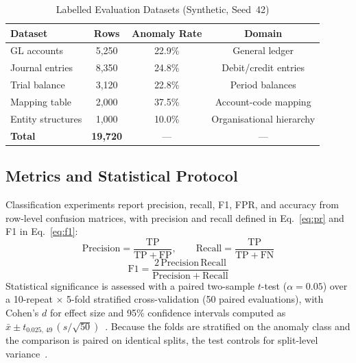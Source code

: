 \documentclass{ieeeaccess}
\begin{document}
\begin{table}[tbp]
\centering
\caption{Labelled Evaluation Datasets (Synthetic, Seed~42)}
\label{tab:datasets}
\small\setlength{\tabcolsep}{4pt}
\begin{tabular}{|l|c|c|c|}
\hline
\textbf{Dataset} & \textbf{Rows} & \textbf{Anomaly Rate} & \textbf{Domain} \\
\hline
GL accounts & 5{,}250 & 22.9\% & General ledger \\
\hline
Journal entries & 8{,}350 & 24.8\% & Debit/credit entries \\
\hline
Trial balance & 3{,}120 & 22.8\% & Period balances \\
\hline
Mapping table & 2{,}000 & 37.5\% & Account-code mapping \\
\hline
Entity structures & 1{,}000 & 10.0\% & Organisational hierarchy \\
\hline
\textbf{Total} & \textbf{19{,}720} & --- & --- \\
\hline
\end{tabular}
\end{table}

\subsection{Metrics and Statistical Protocol}
Classification experiments report precision, recall, F1, FPR, and accuracy from row-level confusion matrices, with
precision and recall defined in Eq.~\ref{eq:pr} and F1 in Eq.~\ref{eq:f1}:
\begin{equation}
\mathrm{Precision} = \frac{\mathrm{TP}}{\mathrm{TP}+\mathrm{FP}}, \qquad
\mathrm{Recall} = \frac{\mathrm{TP}}{\mathrm{TP}+\mathrm{FN}}
\label{eq:pr}
\end{equation}
\begin{equation}
\mathrm{F1} = \frac{2\,\mathrm{Precision}\,\mathrm{Recall}}{\mathrm{Precision}+\mathrm{Recall}}
\label{eq:f1}
\end{equation}
Statistical significance is assessed with a paired two-sample $t$-test ($\alpha=0.05$) over a 10-repeat
$\times$ 5-fold stratified cross-validation (50 paired evaluations), with Cohen's $d$ for effect size and 95\% confidence
intervals computed as $\bar{x}\pm t_{0.025,\,49}\,(s/\sqrt{50})$~\cite{pearson1895notes,han2012data}. Because the
folds are stratified on the anomaly class and the comparison is paired on identical splits, the test controls for
split-level variance~\cite{agrawal1995mining}.
\end{document}
